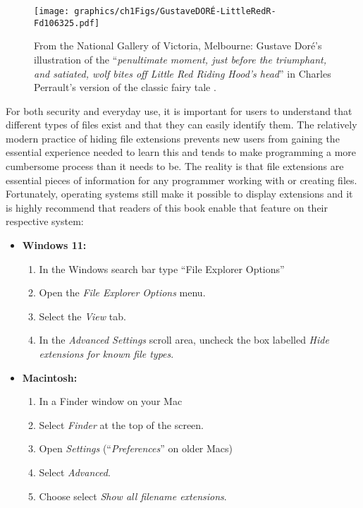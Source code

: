 \vspace{1em}

\begin{figure}[h]
\centering
\texttt{[image: graphics/ch1Figs/GustaveDORÉ-LittleRedR-Fd106325.pdf]}
\caption{From the National Gallery of Victoria, Melbourne: Gustave Doré's illustration of the ``\textit{penultimate moment, just before the triumphant, and satiated, wolf bites off Little Red Riding Hood’s head}'' in Charles Perrault's version of the classic fairy tale \parencite{Dore1862}.}
\end{figure}

For both security and everyday use, it is important for users to understand that different types of files exist and that they can easily identify them. The relatively modern practice of hiding file extensions prevents new users from gaining the essential experience needed to learn this and tends to make programming a more cumbersome process than it needs to be. The reality is that file extensions are essential pieces of information for any programmer working with or creating files. Fortunately, operating systems still make it possible to display extensions and it is highly recommend that readers of this book enable that feature on their respective system:

\begin{itemize}
    \item \textbf{Windows 11:} 
    \begin{enumerate}
    \sffamily\setlength\itemsep{-1em}
        \item In the Windows search bar type ``File Explorer Options''
        \item Open the \textit{File Explorer Options} menu. 
        \item Select the \textit{View} tab. 
        \item In the \textit{Advanced Settings} scroll area, uncheck the box labelled \textit{Hide extensions for known file types}.
    \end{enumerate}

    \item \textbf{Macintosh:} 
    \begin{enumerate}
    \sffamily\setlength\itemsep{-1em}
        \item In a Finder window on your Mac
        \item Select \textit{Finder} at the top of the screen.
        \item Open \textit{Settings} (``\textit{Preferences}'' on older Macs)
        \item Select \textit{Advanced}. 
        \item Choose select \textit{Show all filename extensions}.
    \end{enumerate}

\end{itemize}



